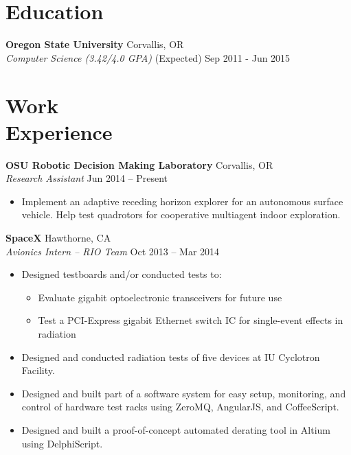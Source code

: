 \documentclass[10pt,letterpaper,margin]{res}
\newcommand{\org}[2]{{\bf #1} \hfill {\color{lightgray} #2} \\}
\newcommand{\pos}[2]{{\it #1} \hfill {\color{lightgray} #2} \vspace{0.0em}}
\begin{document}
\begin{resume}

\section{Education}

\org {Oregon State University} {Corvallis, OR}
\pos {Computer Science (3.42/4.0 GPA)} {(Expected) Sep 2011 - Jun 2015}


\section{Work \\ Experience}

\org {OSU Robotic Decision Making Laboratory} {Corvallis, OR}
\pos {Research Assistant} {Jun 2014 -- Present}

\begin{itemize}
    \item Implement an adaptive receding horizon explorer for an autonomous
        surface vehicle. Help test quadrotors for cooperative multiagent indoor
        exploration.
\end{itemize}


\org {SpaceX} {Hawthorne, CA}
\pos {Avionics Intern -- RIO Team} {Oct 2013 -- Mar 2014}

\begin{itemize}
    \item Designed testboards and/or conducted tests to:
        \begin{itemize}
            \item Evaluate gigabit optoelectronic transceivers for future use
            \item Test a PCI-Express gigabit Ethernet switch IC for
                single-event effects in radiation
        \end{itemize}
    \item Designed and conducted radiation tests of five devices at IU
        Cyclotron Facility.
    \item Designed and built part of a software system for easy setup,
        monitoring, and control of hardware test racks using ZeroMQ, AngularJS,
        and CoffeeScript.
    \item Designed and built a proof-of-concept automated derating tool in
        Altium using DelphiScript.
\end{itemize}



\end{resume}
\end{document}
